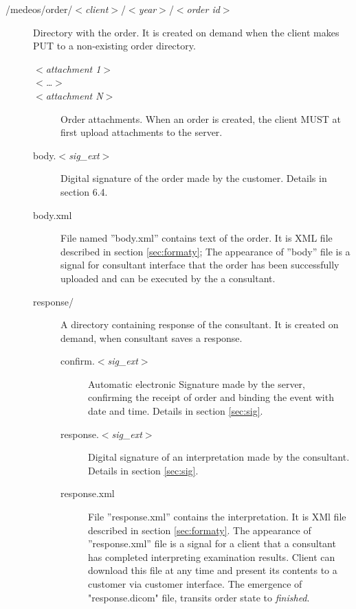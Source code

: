 \documentclass[a4paper]{article}
\begin{document}
\begin{description}
	\item[/medeos/order/$<$\textit{client}$>$/$<$\emph{year}$>$/$<$\textit{order id}$>$]
	Directory with the order. It is created on demand when the client makes PUT to 
	a non-existing order directory.
		\begin{description}
		\item[$<$\textit{attachment 1}$>$]   
		\item[$<$\textit{\ldots}$>$]   
		\item[$<$\textit{attachment N}$>$] Order attachments. When an order is created, 
			the client MUST at first upload attachments to the server.
		\item[body.$<$\textit{sig\_ext}$>$] Digital signature of the order made by the 
			customer. Details in section 6.4.
		\item[body.xml] File named ''body.xml'' contains text of the order. It is XML file 
			described in section \ref{sec:formaty}; The appearance of ''body'' file is a 
			signal for consultant interface that the order has been successfully uploaded 
			and can be executed by the a consultant.
		\item[response/] A directory containing response of the consultant. It is created on
			demand, when consultant saves a response.
			\begin{description}
			\item[confirm.$<$\textit{sig\_ext}$>$]
			Automatic electronic Signature made by the server, confirming the receipt of 
			order and binding the event with date and time. Details in section \ref{sec:sig}.
			\item[response.$<$\textit{sig\_ext}$>$]
			Digital signature of an interpretation made by the consultant. Details in section 
			\ref{sec:sig}.
			\item[response.xml] File ''response.xml'' contains the interpretation. It is XMl 
			file described
			in section \ref{sec:formaty}. The appearance of ''response.xml'' file is a signal for a
			client that a consultant has completed interpreting examination results. Client 
			can download this file at
			any time and present its contents to a customer via customer interface.
			The emergence of "response.dicom" file, transits order state to \emph{finished}.


\end{description}
\end{description}
\end{description}
\end{document}
